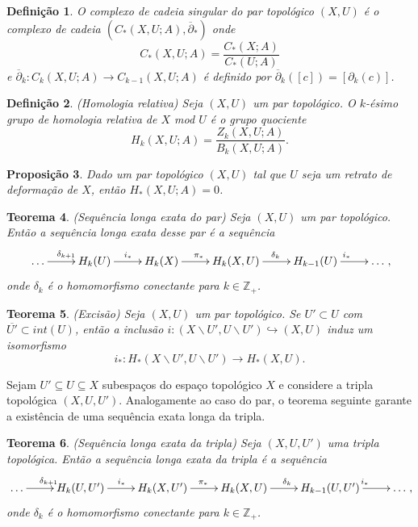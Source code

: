 \documentclass[12pt]{book}
\newtheorem{teorema}{Teorema}[section]
\newtheorem{definicao}[teorema]{Definição}
\newtheorem{proposicao}[teorema]{Proposição}
\newcommand{\bordo}[1]{\partial_{#1}}
\newcommand{\bordorel}[1]{\overline{\partial}_{#1}}
\newcommand{\cadeia}[2]{C_{#1}(#2; A)}
\newcommand{\classe}[1]{[#1]}
\newcommand{\complementar}[2]{#1 \backslash #2}
\newcommand{\homologia}[2]{H_{#1}(#2;A)}
\newcommand{\homologiaabrev}[2]{H_{#1}(#2)}
\newcommand{\imagembordo}[2]{B_{#1}(#2;A)}
\newcommand{\inteiros}{\mathbb{Z}}
\newcommand{\inteirospos}{\inteiros_{+}}
\newcommand{\kernelbordo}[2]{Z_{#1}(#2;A)}
\begin{document}
	\begin{definicao}
		O complexo de cadeia singular do par topológico $(X,U)$ é o complexo de cadeia $(\cadeia{*}{X,U},\bordorel{*} )$ onde 
		$$
		\cadeia{*}{X,U} = \frac{\cadeia{*}{X}}{\cadeia{*}{U}}
		$$
		e $\bordorel{k}: \cadeia{k}{X,U} \to \cadeia{k-1}{X,U}$ é definido por $\bordorel{k}(\classe{c}) = \classe{\bordo{k}(c)}$.
	\end{definicao}
	
	\begin{definicao}
		(Homologia relativa) Seja $(X, U)$ um par topológico. O $k$-ésimo grupo de homologia relativa de $X$ mod $U$ é o grupo quociente
		$$
		\homologia{k}{X,U} = \frac{\kernelbordo{k}{X,U}}{\imagembordo{k}{X, U}}.
		$$
	\end{definicao}
	
	\begin{proposicao}
		Dado um par topológico $(X, U)$ tal que $U$ seja um retrato de deformação de $X$, então $\homologia{*}{X,U} = 0$.
	\end{proposicao}
	
	\begin{teorema}
		(Sequência longa exata do par) Seja $(X, U)$ um par topológico. Então a sequência longa exata desse par é a sequência
		$$
		\xymatrix{\dots \ar[r]^{\delta_{k+1}} & \homologiaabrev{k}{U}\ar[r]^{i_{*}} & \homologiaabrev{k}{X}\ar[r]^{\pi_{*}}& \homologiaabrev{k}{X, U}\ar[r]^{\delta_{k}} & \homologiaabrev{k-1}{U} \ar[r]^{i_{*}}& \dots},
		$$
		onde $\delta_{k}$ é o homomorfismo conectante para $k \in \inteirospos$.
	\end{teorema}
	
	\begin{teorema}
		(Excisão) Seja $(X, U)$ um par topológico. Se $U' \subset U$ com $\overline{U'} \subset int(U)$, então a inclusão $i : (\complementar{X}{U'}, \complementar{U}{U'}) \hookrightarrow (X, U)$ induz um isomorfismo 
		$$
		i_{*}: \homologiaabrev{*}{\complementar{X}{U'}, \complementar{U}{U'}} \to \homologiaabrev{*}{X, U}.
		$$
	\end{teorema}
	
	
	Sejam $U'\subseteq U \subseteq X$ subespaços do espaço topológico $X$ e considere a tripla topológica $(X, U, U')$. Analogamente ao caso do par, o teorema seguinte garante a existência de uma sequência exata longa da tripla.
	
	\begin{teorema}
		(Sequência longa exata da tripla) Seja $(X, U, U')$ uma tripla topológica. Então a sequência longa exata da tripla é a sequência
		$$
		\xymatrix{\dots \ar[r]^{\delta_{k+1}} & \homologiaabrev{k}{U, U'}\ar[r]^{i_{*}} & \homologiaabrev{k}{X, U'}\ar[r]^{\pi_{*}}& \homologiaabrev{k}{X, U}\ar[r]^{\delta_{k}} & \homologiaabrev{k-1}{U, U'} \ar[r]^{i_{*}}& \dots},
		$$
		onde $\delta_{k}$ é o homomorfismo conectante para $k \in \inteirospos$.
	\end{teorema}
	
\end{document}
